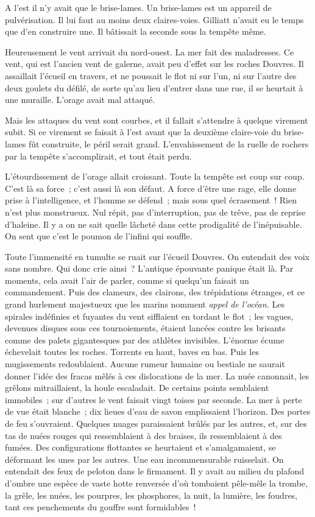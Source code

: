 \documentclass[french,twoside]{book} %
\begin{document}
A l’est il n’y avait que le brise-lames. Un brise-lames est un appareil de pulvérisation. Il lui faut au moins deux claires-voies. Gilliatt n’avait eu le temps que d’en construire une. Il bâtissait la seconde sous la tempête même.\par
Heureusement le vent arrivait du nord-ouest. La mer fait des maladresses. Ce vent, qui est l’ancien vent de galerne, avait peu d’effet sur les roches Douvres. Il assaillait l’écueil en travers, et ne poussait le flot ni sur l’un, ni sur l’autre des deux goulets du défilé, de sorte qu’au lieu d’entrer dans une rue, il se heurtait à une muraille. L’orage avait mal attaqué.\par
Mais les attaques du vent sont courbes, et il fallait  s’attendre à quelque virement subit. Si ce virement se faisait à l’est avant que la deuxième claire-voie du brise-lames fût construite, le péril serait grand. L’envahissement de la ruelle de rochers par la tempête s’accomplirait, et tout était perdu.\par
L’étourdissement de l’orage allait croissant. Toute la tempête est coup sur coup. C’est là sa force ; c’est aussi là son défaut. A force d’être une rage, elle donne prise à l’intelligence, et l’homme se défend ; mais sous quel écrasement ! Rien n’est plus monstrueux. Nul répit, pas d’interruption, pas de trêve, pas de reprise d’haleine. Il y a on ne sait quelle lâcheté dans cette prodigalité de l’inépuisable. On sent que c’est le poumon de l’infini qui souffle.\par
Toute l’immensité en tumulte se ruait sur l’écueil Douvres. On entendait des voix sans nombre. Qui donc crie ainsi ? L’antique épouvante panique était là. Par moments, cela avait l’air de parler, comme si quelqu’un faisait un commandement. Puis des clameurs, des clairons, des trépidations étranges, et ce grand hurlement majestueux que les marins nomment \emph{appel de l’océan.} Les spirales indéfinies et fuyantes du vent sifflaient en tordant le flot ; les vagues, devenues disques sous ces tournoiements, étaient lancées contre les brisants comme des palets gigantesques par des athlètes invisibles. L’énorme écume échevelait toutes les roches. Torrents en haut, baves en bas. Puis les mugissements redoublaient. Aucune rumeur humaine ou bestiale ne saurait donner l’idée des fracas mêlés à ces dislocations de la mer. La nuée canonnait, les grêlons  mitraillaient, la houle escaladait. De certains points semblaient immobiles ; sur d’autres le vent faisait vingt toises par seconde. La mer à perte de vue était blanche ; dix lieues d’eau de savon emplissaient l’horizon. Des portes de feu s’ouvraient. Quelques nuages paraissaient brûlés par les autres, et, sur des tas de nuées rouges qui ressemblaient à des braises, ils ressemblaient à des fumées. Des configurations flottantes se heurtaient et s’amalgamaient, se déformant les unes par les autres. Une eau incommensurable ruisselait. On entendait des feux de peloton dans le firmament. Il y avait au milieu du plafond d’ombre une espèce de vaste hotte renversée d’où tombaient pêle-mêle la trombe, la grêle, les nuées, les pourpres, les phosphores, la nuit, la lumière, les foudres, tant ces penchements du gouffre sont formidables !\par
\end{document}
